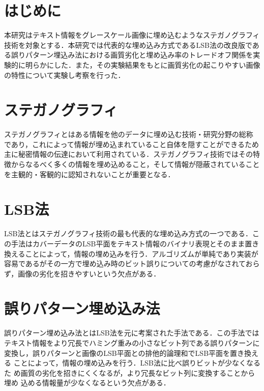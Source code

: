 \documentclass[a4j,fleqn,10pt]{jsarticle}
\begin{document}

\maketitle


\section{はじめに}
本研究はテキスト情報をグレースケール画像に埋め込むようなステガノグラフィ
技術を対象とする．本研究では代表的な埋め込み方式であるLSB法の改良版であ
る誤りパターン埋込み法における画質劣化と埋め込み率のトレードオフ関係を実
験的に明らかにした．また，その実験結果をもとに画質劣化の起こりやすい画像
の特性について実験し考察を行った．

\section{ステガノグラフィ}
ステガノグラフィとはある情報を他のデータに埋め込む技術・研究分野の総称
であり，これによって情報が埋め込まれていること自体を隠すことができるため
主に秘密情報の伝達において利用されている．ステガノグラフィ技術ではその特
徴からなるべく多くの情報を埋め込めること，そして情報が隠蔽されていること
を主観的・客観的に認知されないことが重要となる．

\section{LSB法}
LSB法とはステガノグラフィ技術の最も代表的な埋め込み方式の一つである．こ
の手法はカバーデータのLSB平面をテキスト情報のバイナリ表現とそのまま置き
換えることによって，情報の埋め込みを行う．アルゴリズムが単純であり実装が
容易であるがその一方で埋め込み時のビット誤りについての考慮がなされておら
ず，画像の劣化を招きやすいという欠点がある．

\section{誤りパターン埋め込み法}
誤りパターン埋め込み法とはLSB法を元に考案された手法である．この手法では
テキスト情報をより冗長でハミング重みの小さなビット列である誤りパターンに
変換し，誤りパターンと画像のLSB平面との排他的論理和でLSB平面を置き換える
ことによって，情報の埋め込みを行う．LSB法に比べ誤りビットが少なくなるた
め画質の劣化を招きにくくなるが，より冗長なビット列に変換することから埋め
込める情報量が少なくなるという欠点がある．
\end{document}
